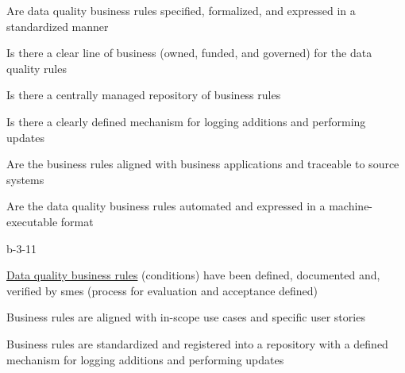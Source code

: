 %
%



\begin{maturity-dimensions}

  \item Are data quality business rules specified, formalized, and expressed in a standardized manner
  \item Is there a clear line of business  (owned, funded, and governed) for the
        data quality rules
  \item Is there a centrally managed repository of business rules
  \item Is there a clearly defined mechanism for logging additions and performing updates
  \item Are the business rules aligned with business applications and traceable to source systems
  \item Are the data quality business rules automated and expressed in a machine-executable format

\end{maturity-dimensions}

\ekgmmCapabilitySectionLevelsOneFive

\begin{level-assessment}{b-3-1}{1}

  \item \hyperref[sec:ekg-mm-data-quality-business-rules]{Data quality business rules} (conditions) have been defined,
        documented and, verified by \glspl{sme} (process for evaluation and acceptance defined)
  \item Business rules are aligned with in-scope use cases and specific user stories
  \item Business rules are standardized and registered into a repository with a defined mechanism for logging
        additions and performing updates

\end{level-assessment}

